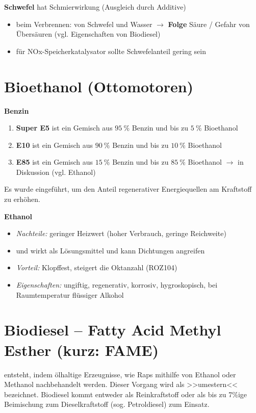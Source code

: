 \textbf{Schwefel} hat Schmierwirkung (Ausgleich durch Additive)

\begin{itemize}
\item
  beim Verbrennen: von Schwefel und Wasser $\to$ \textbf{Folge} Säure
  / Gefahr von Übersäuren (vgl. Eigenschaften von Biodiesel)
\item
  für NOx-Speicherkatalysator sollte Schwefelanteil gering sein
\end{itemize}

\section{Bioethanol (Ottomotoren)}\label{bioethanol-ottomotoren}

\textbf{Benzin}

\begin{enumerate}
\item
  \textbf{Super E5} ist ein Gemisch aus $95~\%$ Benzin und bis zu
  $5~\%$ Bioethanol
\item
  \textbf{E10} ist ein Gemisch aus $90~\%$ Benzin und bis zu $10~\%$
  Bioethanol
\item
  \textbf{E85} ist ein Gemisch aus $15~\%$ Benzin und bis zu $85~\%$
  Bioethanol $\to$ in Diskussion (vgl. Ethanol)
\end{enumerate}

Es wurde eingeführt, um den Anteil regenerativer Energiequellen am
Kraftstoff zu erhöhen.

\textbf{Ethanol}

\begin{itemize}
\item
  \emph{Nachteile:} geringer Heizwert (hoher Verbrauch, geringe
  Reichweite)
\item
  und wirkt als Lösungsmittel und kann Dichtungen angreifen
\item
  \emph{Vorteil:} Klopffest, steigert die Oktanzahl (ROZ104)
\item
  \emph{Eigenschaften:} ungiftig, regenerativ, korrosiv, hygroskopisch,
  bei Raumtemperatur flüssiger Alkohol
\end{itemize}

\section{Biodiesel -- Fatty Acid Methyl Esther (kurz:
FAME)}\label{biodiesel-fatty-acid-methyl-esther-kurz-fame}

entsteht, indem ölhaltige Erzeugnisse, wie Raps mithilfe von Ethanol
oder Methanol nachbehandelt werden. Dieser Vorgang wird als >>umestern<<
bezeichnet. Biodiesel kommt entweder als Reinkraftstoff oder als bis zu
7\%ige Beimischung zum Dieselkraftstoff (sog. Petroldiesel) zum Einsatz.

